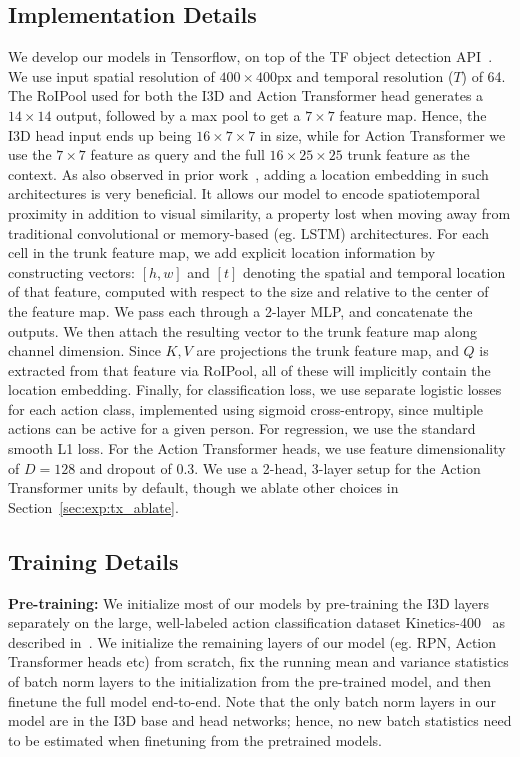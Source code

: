 \documentclass[10pt,twocolumn,letterpaper]{article}
\newcommand{\Tx}[0]{Action Transformer}
\newcommand{\st}[0]{spatiotemporal }
\begin{document}
\subsection{Implementation Details}\label{sec:app:impl}
We develop our models in Tensorflow, on top of the TF object detection
API~\cite{huang2017speed}. We use input spatial resolution of
$400\times 400$px and temporal resolution ($T$) of 64.  The RoIPool
used for both the I3D and \Tx{} head generates a $14\times 14$ output,
followed by a max pool to get a $7\times 7$ feature map. Hence, the
I3D head input ends up being $16\times 7\times 7$ in size, while for
\Tx{} we use the $7\times 7$ feature as query and the full $16\times
25\times 25$ trunk feature as the context.  
As also observed in prior work~\cite{vaswani2017attention,parmar2018image},
adding a location embedding in such architectures is very beneficial.
It allows our model to encode \st{} proximity in addition
to visual similarity, a property lost when moving away from traditional convolutional
or memory-based (eg. LSTM) architectures.
For each cell in the trunk feature map, we add explicit location information by constructing
vectors: $[h, w]$ and $[t]$ denoting the spatial and temporal location
of that feature, computed with respect to the size and relative to the center of the feature map. 
We pass each through a 2-layer MLP, and concatenate
the outputs. We then attach the resulting vector to the trunk feature
map along channel dimension.  Since $K, V$
are projections the trunk feature map, and $Q$ is extracted from that
feature via RoIPool, all of these will implicitly contain the location
embedding.
Finally, for classification loss, we use separate logistic losses for each action
class, implemented using sigmoid cross-entropy, since multiple actions can be active
for a given person. For regression,
we use the standard smooth L1 loss.  For the \Tx{} heads, we use
feature dimensionality of $D=128$ and dropout of 0.3. We use a 2-head,
3-layer setup for the \Tx{} units by default, though we ablate other
choices in Section~\ref{sec:exp:tx_ablate}.

\subsection{Training Details}\label{sec:app:train}



{\noindent \bf Pre-training:} 
We initialize most of our models by
pre-training the I3D layers separately on the large,
well-labeled action classification dataset Kinetics-400~\cite{kay2017kinetics} as described in~\cite{carreira2017quo}.
We initialize the remaining layers of our model (eg. RPN, \Tx{} heads etc) from
scratch, fix the running mean and variance statistics of batch norm layers to
the initialization from the pre-trained model,
and then finetune the full model end-to-end.
Note that the only batch norm layers in our model are in the I3D base and head networks;
hence, no new batch statistics need to be estimated when finetuning from the pretrained models.
\end{document}
